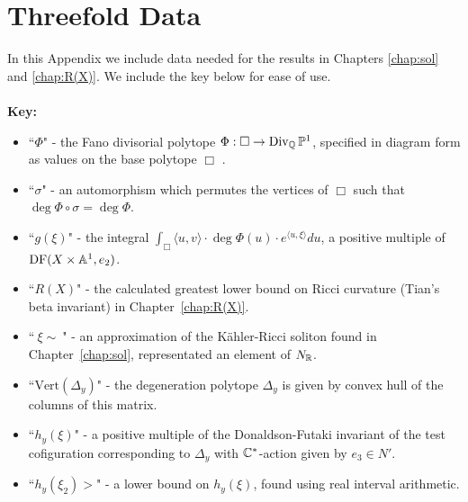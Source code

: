 \chapter{Threefold Data}
\label{appendix1}
\renewcommand{\thefootnote}{\fnsymbol{footnote}} 
\setcounter{footnote}{0}
In this Appendix we include data needed for the results in Chapters \ref{chap:sol} and \ref{chap:R(X)}. We include the key below for ease of use. \\ \\
\textbf{Key:}
\begin{itemize}
\item ``\(\Phi\)" - the Fano divisorial polytope \(\Phi: \Box \to \operatorname{Div}_{\mathbb{Q}} \mathbb{P}^1\), specified in diagram form as values on the base polytope \(\Box\) .
\item ``\(\sigma \)" - an automorphism which permutes the vertices of \(\Box\) such that \(\deg \Phi \circ \sigma = \deg \Phi\).
\item ``\(g(\xi)\)" - the integral \(\int_\Box \langle u, v \rangle \cdot \deg \Phi (u) \cdot e^{\langle u, \xi \rangle} du\), a positive multiple of \(\mathop{\rm DF}\nolimits(X \times \mathbb{A}^1, e_2)\).
\item ``\(R(X)\)" - the calculated greatest lower bound on Ricci curvature (Tian's beta invariant) in Chapter~\ref{chap:R(X)}.
\item ``\( \ \xi \sim \ \)" - an approximation of the K\"ahler-Ricci soliton found in Chapter~\ref{chap:sol}, representated an element of \(N_{\mathbb{R}}\).
\item ``\(\text{Vert}(\Delta_y)\)" - the degeneration polytope \(\Delta_y\) is given by convex hull of the columns of this matrix.
\item ``\(h_y(\xi)\)" - a positive multiple of the Donaldson-Futaki invariant of the test cofiguration corresponding to \(\Delta_y\) with \(\mathbb{C}^*\)-action given by \(e_3 \in N'\).
\item ``\(h_y(\xi_2) >\)" - a lower bound on \(h_y(\xi)\), found using real interval arithmetic.
\end{itemize}

